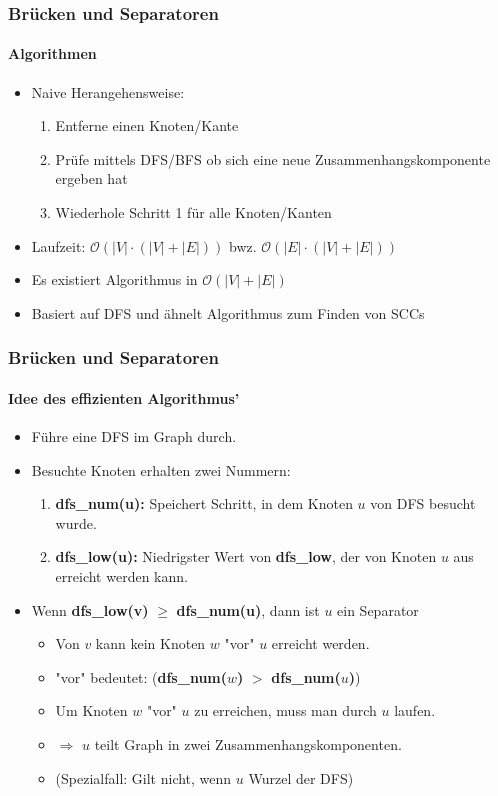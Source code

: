 \begin{frame}
	\frametitle{Brücken und Separatoren}
	\framesubtitle{Algorithmen}
	\begin{itemize}
		\item Naive Herangehensweise:
			\begin{enumerate}
				\item Entferne einen Knoten/Kante
				\item Prüfe mittels DFS/BFS ob sich eine neue Zusammenhangskomponente ergeben hat
				\item Wiederhole Schritt 1 für alle Knoten/Kanten
			\end{enumerate}
			\item Laufzeit: $\mathcal{O}(|V| \cdot (|V| + |E|))$ bwz. $\mathcal{O}(|E| \cdot (|V| + |E|))$
			\item Es existiert Algorithmus  in  $\mathcal{O}(|V| + |E|)$
			\item Basiert auf DFS und ähnelt Algorithmus zum Finden von SCCs
	\end{itemize}
\end{frame}
\begin{frame}
	\frametitle{Brücken und Separatoren}
	\framesubtitle{Idee des effizienten Algorithmus'}
	\begin{itemize}
		\item Führe eine DFS im Graph durch.
		\item Besuchte Knoten erhalten zwei Nummern:
		\pause
			\begin{enumerate}
				\item \textbf{dfs\_num(u):} Speichert Schritt, in dem Knoten $u$ von DFS besucht wurde.
				\item \textbf{dfs\_low(u):} Niedrigster Wert von \textbf{dfs\_low}, der von Knoten $u$ aus erreicht werden kann. 
			\end{enumerate}
			\pause
			\item Wenn \textbf{dfs\_low(v)} $\geq$ \textbf{dfs\_num(u)}, dann ist $u$ ein Separator 
			\begin{itemize}
				 \item Von $v$ kann kein Knoten $w$ "vor" $u$ erreicht werden.
				 \item "vor" bedeutet: (\textbf{dfs\_num($w$)} $>$ \textbf{dfs\_num($u$)})
				 \item Um Knoten $w$ "vor" $u$ zu erreichen, muss man durch $u$ laufen.
				 \item $\Rightarrow$ $u$ teilt Graph in zwei Zusammenhangskomponenten.
				 \item (Spezialfall: Gilt nicht, wenn $u$ Wurzel der DFS)
			\end{itemize} 
	\end{itemize}
\end{frame}
